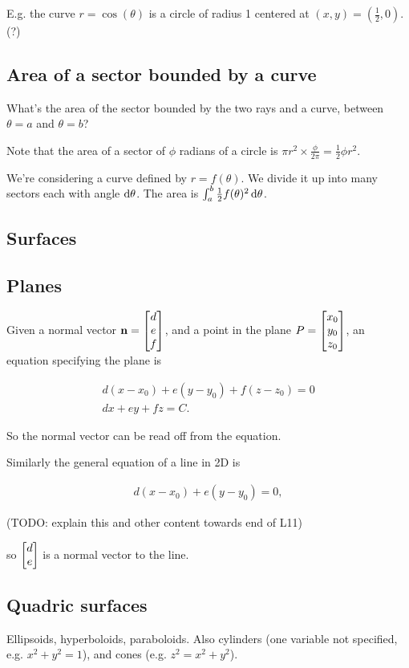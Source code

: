 E.g. the curve $r = \cos(\theta)$ is a circle of radius 1 centered at
$(x, y) = (\frac{1}{2}, 0)$. (?)

\subsection*{Area of a sector bounded by a curve}

What's the area of the sector bounded by the two rays and a curve, between
$\theta=a$ and $\theta=b$?

Note that the area of a sector of $\phi$ radians of a circle is
$\pi r^2 \times \frac{\phi}{2\pi} = \frac{1}{2}\phi r^2$.

We're considering a curve defined by $r = f(\theta)$. We divide it up into many
sectors each with angle $\dtheta$. The area is
$\int_a^b \frac{1}{2}f(\theta)^2\dtheta$.

\subsection{Surfaces}

\subsection*{Planes}
Given a normal vector $\mathbf n = \begin{bmatrix}d\\e\\f\end{bmatrix}$, and a point in the plane
$P = \begin{bmatrix}x_0\\y_0\\z_0\end{bmatrix}$, an equation specifying the plane is

\begin{align*}
  d(x - x_0) + e(y - y_0) + f(z - z_0) = 0 \\
  dx + ey + fz = C.
\end{align*}

So the normal vector can be read off from the equation.

Similarly the general equation of a line in 2D is

\begin{align*}
  d(x - x_0) + e(y - y_0) = 0,
\end{align*}

(TODO: explain this and other content towards end of L11)

so $\begin{bmatrix}d\\e\end{bmatrix}$ is a normal vector to the line.


\subsection*{Quadric surfaces}
Ellipsoids, hyperboloids, paraboloids. Also cylinders (one variable not
specified, e.g. $x^2 + y^2 = 1$), and cones (e.g. $z^2 = x^2 + y^2$).

